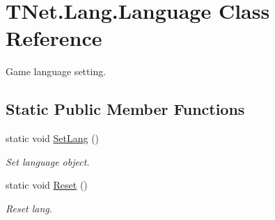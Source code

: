 \hypertarget{class_t_net_1_1_lang_1_1_language}{}\section{T\+Net.\+Lang.\+Language Class Reference}
\label{class_t_net_1_1_lang_1_1_language}


Game language setting.  


\subsection*{Static Public Member Functions}
\begin{DoxyCompactItemize}
\item 
static void \mbox{\hyperlink{class_t_net_1_1_lang_1_1_language_a1b375c75980d9b5fe4648f39a594d311}{Set\+Lang}} ()
\begin{DoxyCompactList}\small\item\em Set language object. \end{DoxyCompactList}\item 
static void \mbox{\hyperlink{class_t_net_1_1_lang_1_1_language_aa1896863a4e71b42b4f55133c668dbe0}{Reset}} ()
\begin{DoxyCompactList}\small\item\em Reset lang. \end{DoxyCompactList}\end{DoxyCompactItemize}
